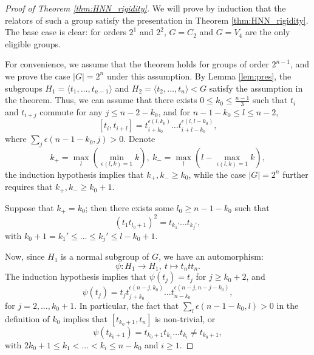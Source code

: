 \documentclass[10pt,a4paper]{amsart}
\begin{document}
\begin{proof}[Proof of Theorem \ref{thm:HNN_rigidity}]
    We will prove by induction that the relators of such a group satisfy the presentation in Theorem \ref{thm:HNN_rigidity}. The base case is clear: for orders $2^1$ and $2^2$, $G = C_2$ and $G = V_4$ are the only eligible groups.
    
    For convenience, we assume that the theorem holds for groups of order $2^{n-1}$, and we prove the case $\lvert G\rvert = 2^n$ under this assumption. By Lemma \ref{lem:pres}, the subgroups $H_1 = \langle t_1,\dots, t_{n-1}\rangle$ and $H_2 = \langle t_2,\dots, t_n\rangle < G$ satisfy the assumption in the theorem. Thus, we can assume that there exists $0\leq k_0\leq \frac{n-1}{3}$ such that $t_i$ and $t_{i+j}$ commute for any $j\leq n-2-k_0$, and for $n-1-k_0\leq l\leq n-2$,
    \[
    [t_i,t_{i+l}] = t_{i+k_0}^{\epsilon(l,k_0)}\dots t_{i+l-k_0}^{\epsilon(l,l-k_0)},
    \]
    where $\sum_j\epsilon(n-1-k_0,j)>0$. Denote
    \[
    k_+ = \max_l(\min_{\epsilon(l,k)=1}k),\ k_- = \max_l(l - \max_{\epsilon(l,k) = 1} k),
    \]
    the induction hypothesis implies that $k_+,k_-\geq k_0$, while the case $\lvert G\rvert = 2^n$ further requires that $k_+,k_-\geq k_0+1$.
    
    Suppose that $k_+ = k_0$; then there exists some $l_0\geq n-1-k_0$ such that
    \[
    (t_1t_{l_0+1})^2 = t_{k_1'}\dots t_{k_j'},
    \]
    with $k_0+1=k_1'\leq\dots\leq k_j'\leq l-k_0+1$.
    
    Now, since $H_1$ is a normal subgroup of $G$, we have an automorphism:
    \[
    \psi:H_1\to H_1,\ t\mapsto t_ntt_n.
    \]
    The induction hypothesis implies that $\psi(t_j) = t_j$ for $j\geq k_0+2$, and
    \[
    \psi(t_j) = t_j t_{j+k_0}^{\epsilon(n-j,k_0)}\dots t_{n-k_0}^{\epsilon(n-j,n-j-k_0)},
    \]
    for $j=2,\dots, k_0+1$. In particular, the fact that $\sum_l\epsilon(n-1-k_0,l)>0$ in the definition of $k_0$ implies that $[t_{k_0+1},t_n]$ is non-trivial, or
    \[
    \psi(t_{k_0+1}) = t_{k_0+1}t_{k_1}\dots t_{k_i} \neq t_{k_0+1},
    \]
    with $2k_0+1\leq k_1<\dots< k_i\leq n-k_0$ and $i\geq 1$.
    

\end{proof}
\end{document}
